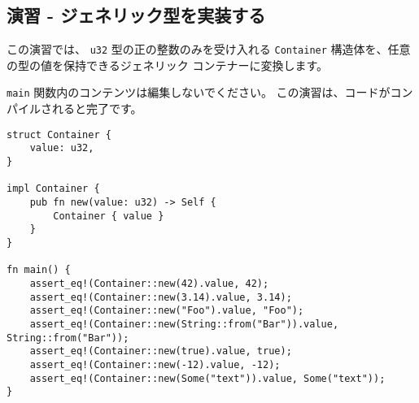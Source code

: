 \subsection{演習 - ジェネリック型を実装する}

この演習では、 \texttt{u32} 型の正の整数のみを受け入れる \texttt{Container} 構造体を、任意の型の値を保持できるジェネリック コンテナーに変換します。

\texttt{main} 関数内のコンテンツは編集しないでください。 この演習は、コードがコンパイルされると完了です。

\begin{lstlisting}[numbers=none]
struct Container {
    value: u32,
}

impl Container {
    pub fn new(value: u32) -> Self {
        Container { value }
    }
}

fn main() {
    assert_eq!(Container::new(42).value, 42);
    assert_eq!(Container::new(3.14).value, 3.14);
    assert_eq!(Container::new("Foo").value, "Foo");
    assert_eq!(Container::new(String::from("Bar")).value, String::from("Bar"));
    assert_eq!(Container::new(true).value, true);
    assert_eq!(Container::new(-12).value, -12);
    assert_eq!(Container::new(Some("text")).value, Some("text"));
}
\end{lstlisting}




